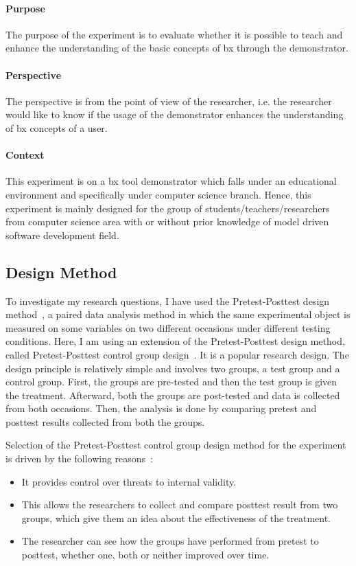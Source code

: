 \paragraph{Purpose}
The purpose of the experiment is to evaluate whether it is possible to teach and enhance the understanding of the basic concepts of bx through the demonstrator.

\paragraph{Perspective}
The perspective is from the point of view of the researcher, i.e. the researcher would like to know if the usage of the demonstrator enhances the understanding of bx concepts of a user.

\paragraph{Context}
This experiment is on a bx tool demonstrator which falls under an educational environment and specifically under computer science branch. Hence, this experiment is mainly designed for the group of students/teachers/researchers from computer science area with or without prior knowledge of model driven software development field.

\subsection{Design Method}\label{subsec:designmethod} 
To investigate my research questions, I have used the Pretest-Posttest design method~\cite{analysisprepostdesigns}, a paired data analysis method in which the same experimental object is measured on some variables on two different occasions under different testing conditions. Here, I am using an extension of the Pretest-Posttest design method, called Pretest-Posttest control group design~\cite{expandquasiexpdesign}. It is a popular research design. The design principle is relatively simple and involves two groups, a test group and a control group. First, the groups are pre-tested and then the test group is given the treatment. Afterward, both the groups are post-tested and data is collected from both occasions. Then, the analysis is done by comparing pretest and posttest results collected from both the groups.

Selection of the Pretest-Posttest control group design method for the experiment is driven by the following reasons~\cite{anovapreposttest}:
\begin{itemize}
	\item It provides control over threats to internal validity.
	\item This allows the researchers to collect and compare posttest result from two groups, which give them an idea about the effectiveness of the treatment.
	\item The researcher can see how the groups have performed from pretest to posttest, whether one, both or neither improved over time.
\end{itemize}

